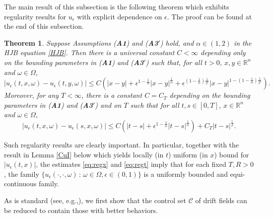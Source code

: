 \documentclass[11pt,reqno]{amsart}
\newtheorem{thm}{Theorem}[section]
\theoremstyle{definition}
\theoremstyle{remark}
\numberwithin{equation}{section}
\newcommand{\eps}{\epsilon}
\newcommand{\R}{{\mathbb{R}}}
\begin{document}
\medskip

The main result of this subsection is the following theorem which exhibits regularity results for $u_\eps$ with explicit dependence on $\eps$. The proof can be found at the end of this subsection.

\begin{thm}\label{thm:regularity} Suppose Assumptions {\upshape ({\bf A1})} and {\upshape ({\bf A3$'$})} hold, and $\alpha \in (1,2)$ in the HJB equation \eqref{HJB}. Then there is a universal constant $C<\infty$ depending only on the bounding parameters in {\upshape({\bf A1})} and {\upshape({\bf A3$'$})} such that, for all $t>0$, $x,y\in \R^n$ and $\omega\in \Omega$,
\begin{equation}
    \label{eq:regx}
|u_\eps(t,x,\omega)-u_\eps(t,y,\omega)| \le C\left(|x-y| +\eps^{1-\frac1\alpha} |x-y|^{\frac1\alpha} + \eps^{(1-\frac1\alpha)\frac{1}{\beta'}} |x-y|^{1-(1-\frac1\alpha)\frac{1}{\beta'}}\right).
\end{equation}
Moreover, for any $T<\infty$, there is a constant $C = C_T$ depending on the bounding parameters in {\upshape({\bf A1})} and {\upshape({\bf A3$'$})} and on $T$ such that for all $t,s \in [0,T]$, $x\in \R^n$ and $\omega \in \Omega$,
\begin{equation}
    \label{eq:regt}
    |u_\eps(t,x,\omega)-u_\eps(s,x,\omega)| \le C\left( |t-s| + \eps^{1-\frac1\alpha}|t-s|^{\frac1\alpha}\right) + C_T|t-s|^{\frac1\beta}.
\end{equation}
\end{thm}

Such regularity results are clearly important. In particular, together with the result in Lemma \ref{CuI} below which yields locally (in $t$) uniform (in $x$) bound for $|u_\eps(t,x)|$, the estimates \eqref{eq:regx} and \eqref{eq:regt} imply that for each fixed $T,R>0$, the family $\{u_\eps(\cdot,\cdot,\omega) \,:\, \omega\in \Omega, \eps\in (0,1)\}$ is a uniformly bounded and equi-continuous family.

\medskip

As is standard (see, e.g.,\cite{KRV06}), we first show that the control set $\mathscr{C}$ of drift fields can be reduced to contain those with better behaviors.
\end{document}
